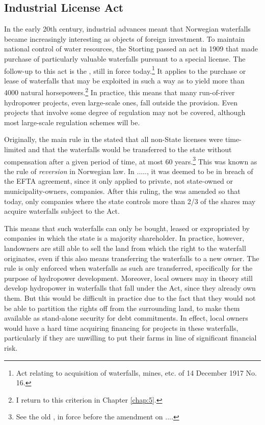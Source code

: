 \subsection{Industrial License Act}\label{sec:ica17}

In the early 20th century, industrial advances meant that Norwegian waterfalls became increasingly interesting as objects of foreign investment. To maintain national control of water resources, the Storting passed an act in 1909 that made purchase of particularly valuable waterfalls pursuant to a special license. The follow-up to this act is the \cite{ica17}, still in force today.\footnote{Act relating to acquisition of waterfalls, mines, etc. of 14 December 1917 No. 16.} It applies to the purchase or lease of waterfalls that may be exploited in such a way as to yield more than 4000 natural horsepowers.\footnote{I return to this criterion in Chapter \ref{chap:5}.} In practice, this means that many run-of-river hydropower projects, even large-scale ones, fall outside the provision. Even projects that involve some degree of regulation may not be covered, although most large-scale regulation schemes will be.

Originally, the main rule in the \cite{ica17} stated that all non-State licenses were time-limited and that the waterfalls would be transferred to the state without compensation after a given period of time, at most 60 years.\footnote{See the old \cite[2]{ica17}, in force before the amendment on ....} This was known as the rule of {\it reversion} in Norwegian law. In ....., it was deemed to be in breach of the EFTA agreement, since it only applied to private, not state-owned or municipality-owners, companies.  After this ruling, the \cite{ica17} was amended so that today, only companies where the state controls more than 2/3 of the shares may acquire waterfalls subject to the Act.

This means that such waterfalls can only be bought, leased or expropriated by companies in which the state is a majority shareholder. In practice, however, landowners are still able to sell the land from which the right to the waterfall originates, even if this also means transferring the waterfalls to a new owner. The rule is only enforced when waterfalls as such are transferred, specifically for the purpose of hydropower development. Moreover, local owners may in theory still develop hydropower in waterfalls that fall under the Act, since they already own them. But this would be difficult in practice due to the fact that they would not be able to partition the rights off from the surrounding land, to make them available as stand-alone security for debt commitments. In effect, local owners would have a hard time acquiring financing for projects in these waterfalls, particularly if they are unwilling to put their farms in line of significant financial risk.

